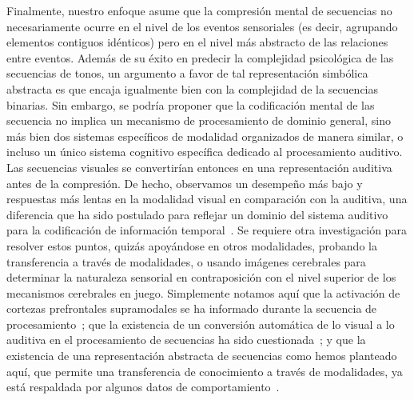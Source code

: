 Finalmente, nuestro enfoque asume que la compresión mental de secuencias no necesariamente ocurre en el nivel de los eventos sensoriales (es decir, agrupando elementos contiguos idénticos) pero en el nivel más abstracto de las relaciones entre eventos. Además de su éxito en predecir la complejidad psicológica de las secuencias de tonos, un argumento a favor de tal representación simbólica abstracta es que encaja igualmente bien con la complejidad de la secuencias binarias. Sin embargo, se podría proponer que la codificación mental de las secuencia no implica un mecanismo de procesamiento de dominio general, sino más bien dos sistemas específicos de modalidad organizados de manera similar, o incluso un único sistema cognitivo específica dedicado al procesamiento auditivo. Las secuencias visuales se convertirían entonces en una representación auditiva antes de la compresión. De hecho, observamos un desempeño más bajo y respuestas más lentas en la modalidad visual en comparación con la auditiva, una diferencia que ha sido postulado para reflejar un dominio del sistema auditivo para la codificación de información temporal~\cite{f91,f118,f119}. Se requiere otra investigación para resolver estos puntos, quizás apoyándose en otros modalidades, probando la transferencia a través de modalidades, o usando imágenes cerebrales para determinar la naturaleza sensorial en contraposición con el nivel superior de los mecanismos cerebrales en juego. Simplemente notamos aquí que la activación de cortezas prefrontales supramodales se ha informado durante la secuencia de procesamiento~\cite{f19,f60}; que la existencia de un conversión automática de lo visual a lo auditiva en el procesamiento de secuencias ha sido cuestionada~\cite{f121}; y que la existencia de una representación abstracta de secuencias como hemos planteado aquí, que permite una transferencia de conocimiento a través de modalidades, ya está respaldada por algunos datos de comportamiento~\cite{yildirim2015learning}.

